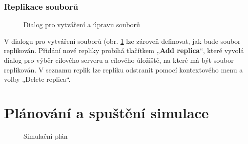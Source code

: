 \documentclass[czech,DP]{thesiskiv}
\begin{document}
\subsubsection*{Replikace souborů}

\begin{figure}[H]
\centering
\caption{Dialog pro vytváření a úpravu souborů}
\label{fig:p_uloziste_soubor_replikace}
\end{figure}

V dialogu pro vytváření souborů (obr. \ref{fig:p_uloziste_soubor_replikace} lze zároveň definovat, jak bude soubor replikován. Přidání nové repliky probíhá tlačítkem „\textbf{Add replica}“, které vyvolá dialog pro výběr cílového serveru a cílového úložiště, na které má být soubor replikován. V seznamu replik lze repliku odstranit pomocí kontextového menu a volby „Delete replica“.

\section{Plánování a spuštění simulace}

\begin{figure}[H]
\centering
\caption{Simulační plán}
\label{fig:p_klient_plan_simulace}
\end{figure}
\end{document}
